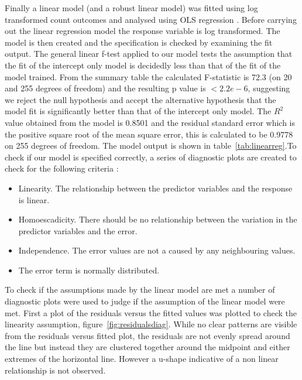 Finally a linear model (and a robust linear model) was fitted using log transformed count outcomes and analysed using OLS regression \citep{UCLAPoiss}. Before carrying out the linear regression model the response variable is log transformed. The model is then created and the specification is checked by examining the fit output. The general linear f-test applied to our model tests the assumption that the fit of the intercept only model is decidedly less than that of the fit of the model trained. From the summary table the calculated F-statistic is 72.3 (on 20 and 255 degrees of freedom) and the resulting p value is $< 2.2e-6$, suggesting we reject the null hypothesis and accept the alternative hypothesis that the model fit is significantly better than that of the intercept only model. The $R^2$ value obtained from the model is  0.8501 and the residual standard error which is the positive square root of the mean square error, this is calculated to be 0.9778 on 255 degrees of freedom. The model output is shown in table~\ref{tab:linearreg}.To check if our model is specified correctly, a series of diagnostic plots are created to check for the following criteria :
\begin{itemize}
\item Linearity. The relationship between the predictor variables and the response is linear.
\item Homoescadicity. There should be no relationship between the variation in the predictor variables and the error.
\item Independence. The error values are not a caused by any neighbouring values.
\item The error term is normally distributed.
\end{itemize}

To check if the assumptions made by the linear model are met a number of diagnostic plots were used to judge if the assumption of the linear model were met. First a plot of the residuals versus the fitted values was plotted to check the linearity assumption, figure~\ref{fig:residualsdiag}. While no clear patterns are visible from the residuals versus fitted plot, the residuals are not evenly spread around the line but instead they are clustered together around the midpoint and either extremes of the horizontal line. However a u-shape indicative of a non linear relationship is not observed. 

